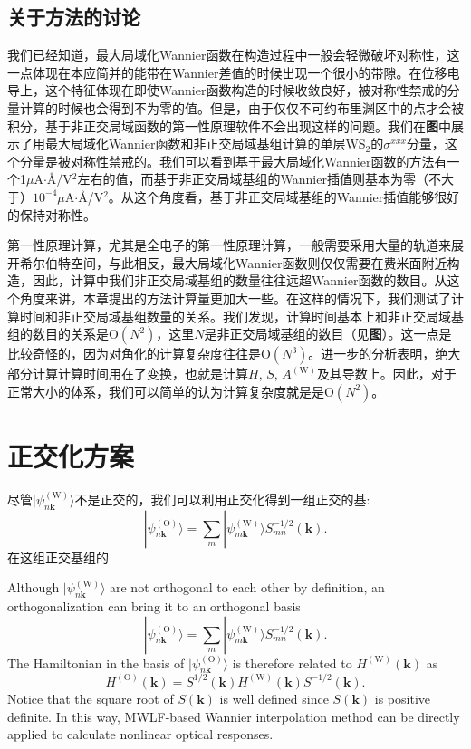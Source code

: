 \subsection{关于方法的讨论}

我们已经知道，最大局域化Wannier函数在构造过程中一般会轻微破坏对称性，这一点体现在本应简并的能带在Wannier差值的时候出现一个很小的带隙。在位移电导上，这个特征体现在即使Wannier函数构造的时候收敛良好，被对称性禁戒的分量计算的时候也会得到不为零的值。但是，由于仅仅不可约布里渊区中的点才会被积分，基于非正交局域函数的第一性原理软件不会出现这样的问题。我们在\textbf{图}中展示了用最大局域化Wannier函数和非正交局域基组计算的单层WS$_2$的$\sigma^{xxx}$分量，这个分量是被对称性禁戒的。我们可以看到基于最大局域化Wannier函数的方法有一个1$\mu$A$\cdot$\AA/V$^2$左右的值，而基于非正交局域基组的Wannier插值则基本为零（不大于）$10^{-4}\mu$A$\cdot$\AA/V$^2$。从这个角度看，基于非正交局域基组的Wannier插值能够很好的保持对称性。

第一性原理计算，尤其是全电子的第一性原理计算，一般需要采用大量的轨道来展开希尔伯特空间，与此相反，最大局域化Wannier函数则仅仅需要在费米面附近构造，因此，计算中我们非正交局域基组的数量往往远超Wannier函数的数目。从这个角度来讲，本章提出的方法计算量更加大一些。在这样的情况下，我们测试了计算时间和非正交局域基组数量的关系。我们发现，计算时间基本上和非正交局域基组的数目的关系是$\text{O}(N^2)$，这里$N$是非正交局域基组的数目（见\textbf{图}）。这一点是比较奇怪的，因为对角化的计算复杂度往往是$\text{O}(N^3)$。进一步的分析表明，绝大部分计算计算时间用在了变换，也就是计算$H$, $S$, $A^{(\text{W})}$及其导数上。因此，对于正常大小的体系，我们可以简单的认为计算复杂度就是是$\text{O}(N^2)$。


\section{正交化方案}

尽管$|\psi^{(\text{W})}_{n\boldsymbol{k}}\rangle$不是正交的，我们可以利用正交化得到一组正交的基:
\begin{equation}
|\psi^{(\text{O})}_{n\boldsymbol{k}}\rangle=
\sum_m |\psi^{(\text{W})}_{m\boldsymbol{k}}\rangle S^{-1/2}_{mn}(\boldsymbol{k}).
\end{equation}
在这组正交基组的

Although $|\psi^{(\text{W})}_{n\boldsymbol{k}}\rangle$ are not orthogonal to each other by definition, an orthogonalization can bring it to an orthogonal basis
\begin{equation}
|\psi^{(\text{O})}_{n\boldsymbol{k}}\rangle=
\sum_m |\psi^{(\text{W})}_{m\boldsymbol{k}}\rangle S^{-1/2}_{mn}(\boldsymbol{k}).
\end{equation}
The Hamiltonian in the basis of $|\psi^{(\text{O})}_{n\boldsymbol{k}}\rangle$ is therefore related to $H^{(\text{W})}(\boldsymbol{k})$ as
\begin{equation}
H^{(\text{O})}(\boldsymbol{k})=S^{1/2}(\boldsymbol{k})H^{(\text{W})}(\boldsymbol{k})S^{-1/2}(\boldsymbol{k}).\label{HO-HW}
\end{equation}
Notice that the square root of $S(\boldsymbol{k})$ is well defined since $S(\boldsymbol{k})$ is positive definite. In this way, MWLF-based Wannier interpolation method can be directly applied to calculate nonlinear optical responses.

